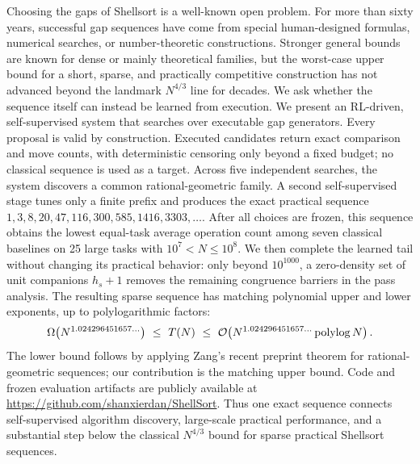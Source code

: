 Choosing the gaps of Shellsort is a well-known open problem.  For more than
sixty years, successful gap sequences have come from special human-designed
formulas, numerical searches, or number-theoretic constructions.  Stronger
general bounds are known for dense or mainly theoretical families, but the
worst-case upper bound for a short, sparse, and practically competitive
construction has not advanced beyond the landmark $N^{4/3}$ line for decades.
We ask whether the sequence itself can instead be learned from execution.  We
present an RL-driven, self-supervised system that searches over executable gap
generators.  Every proposal is valid by construction.  Executed candidates
return exact comparison and move counts, with deterministic censoring only
beyond a fixed budget; no classical sequence is used as a target.  Across five
independent searches, the system discovers a common
rational-geometric family.  A second self-supervised stage tunes only a finite
prefix and produces the exact practical sequence
$1,3,8,20,47,116,300,585,1416,3303,\ldots$.  After all choices are frozen, this
sequence obtains the lowest equal-task average operation count among seven
classical baselines on 25 large tasks with $10^7<N\le10^8$.  We then complete
the learned tail without changing its practical behavior: only beyond
$10^{1000}$, a zero-density set of unit companions $h_s+1$ removes the
remaining congruence barriers in the pass analysis.  The resulting sparse
sequence has matching polynomial upper and lower exponents, up to
polylogarithmic factors:
\[
  \Omega\!\left(N^{1.024296451657\ldots}\right)
  \ \le\ T(N)\ \le\
  \mathcal{O}\!\left(N^{1.024296451657\ldots}\operatorname{polylog} N\right).
\]
The lower bound follows by applying Zang's recent preprint theorem for
rational-geometric sequences; our contribution is the matching upper bound.
Code and frozen evaluation artifacts are publicly available at
\url{https://github.com/shanxierdan/ShellSort}.
Thus one exact sequence connects self-supervised algorithm discovery,
large-scale practical performance, and a substantial step below the classical
$N^{4/3}$ bound for sparse practical Shellsort sequences.
